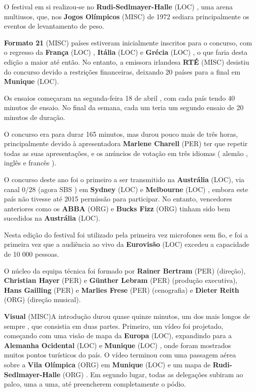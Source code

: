 \documentclass[12pt,a4paper]{article}
\begin{document}
O festival em si realizou-se no \textbf{Rudi-Sedlmayer-Halle} (LOC) , uma arena multiusos, que, nos \textbf{Jogos Olímpicos} (MISC) de 1972 sediara principalmente os eventos de levantamento de peso.



\textbf{Formato 21} (MISC) países estiveram inicialmente inscritos para o concurso, com o regresso da \textbf{França} (LOC) , \textbf{Itália} (LOC) e \textbf{Grécia} (LOC) , o que faria desta edição a maior até então. No entanto, a emissora irlandesa \textbf{RTÉ} (MISC) desistiu do concurso devido a restrições financeiras, deixando 20 países para a final em \textbf{Munique} (LOC).

Os ensaios começaram na segunda-feira 18 de abril , com cada país tendo 40 minutos de ensaio. No final da semana, cada um teria um segundo ensaio de 20 minutos de duração.

O concurso era para durar 165 minutos, mas durou pouco mais de três horas, principalmente devido à apresentadora \textbf{Marlene Charell} (PER) ter que repetir todas as suas apresentações, e os anúncios de votação em três idiomas ( alemão , inglês e francês ).

O concurso deste ano foi o primeiro a ser transmitido na \textbf{Austrália} (LOC), via canal 0/28 (agora SBS ) em \textbf{Sydney} (LOC) e \textbf{Melbourne} (LOC) , embora este país não tivesse até 2015 permissão para participar. No entanto, vencedores anteriores como os \textbf{ABBA} (ORG) e \textbf{Bucks Fizz} (ORG) tinham sido bem sucedidos na \textbf{Austrália} (LOC).

Nesta edição do festival foi utilizado pela primeira vez microfones sem fio, e foi a primeira vez que a audiência ao vivo da \textbf{Eurovisão} (LOC) excedeu a capacidade de 10 000 pessoas.

O núcleo da equipa técnica foi formado por \textbf{Rainer Bertram} (PER) (direção), \textbf{Christian Hayer} (PER) e \textbf{Günther Lebram} (PER) (produção executiva), \textbf{Hans Gailling} (PER) e \textbf{Marlies Frese} (PER) (cenografia) e \textbf{Dieter Reith} (ORG) (direção musical).



\textbf{Visual} (MISC)A introdução durou quase quinze minutos, um dos mais longos de sempre , que consistia em duas partes. Primeiro, um vídeo foi projetado, começando com uma visão de mapa da \textbf{Europa} (LOC), expandindo para a \textbf{Alemanha Ocidental} (LOC) e \textbf{Munique} (LOC) , onde foram mostrados muitos pontos turísticos do país. O vídeo terminou com uma passagem aérea sobre a \textbf{Vila Olímpica} (ORG) em \textbf{Munique} (LOC) e um mapa de \textbf{Rudi-Sedlmayer-Halle} (ORG) . Em segundo lugar, todas as delegações subiram ao palco, uma a uma, até preencherem completamente o pódio.
\end{document}
